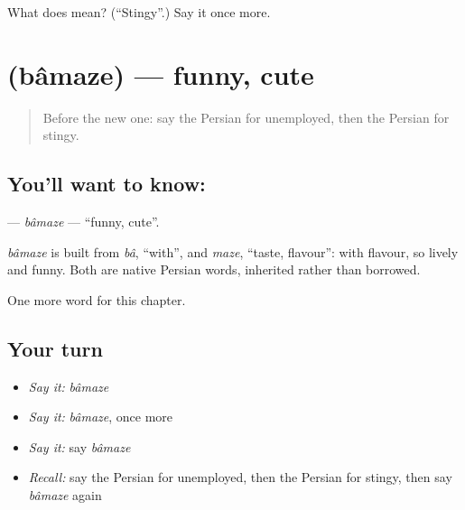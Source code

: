 \begin{tcolorbox}[breakable,colback=teal!4,colframe=teal!35!black,title={Before you move on}]
What does  mean? (\textquotedblleft{}Stingy\textquotedblright{}.) Say it once more.
\end{tcolorbox}
\section[\texorpdfstring{\fa{بامزه} (bâmaze)}{بامزه (bâmaze)}]{ (bâmaze) — funny, cute}

\label{lesson:FA-C236-bamaze}



\begin{quote}
Before the new one: say the Persian for unemployed, then the Persian for stingy.
\end{quote}

\subsection*{You'll want to know: }
\textbf{} — \emph{bâmaze} — \textquotedblleft{}funny, cute\textquotedblright{}.

\begin{cousinweb}
\emph{bâmaze} is built from \emph{bâ}, \textquotedblleft{}with\textquotedblright{}, and \emph{maze}, \textquotedblleft{}taste, flavour\textquotedblright{}: with flavour, so lively and funny. Both are native Persian words, inherited rather than borrowed.
\end{cousinweb}

\begin{grammarlens}[title={What you've built}]
One more word for this chapter.
\end{grammarlens}

\subsection*{Your turn}
\begin{itemize}
\raggedright
  \item \emph{Say it:} \emph{bâmaze}
  \item \emph{Say it:} \emph{bâmaze}, once more
  \item \emph{Say it:} say \emph{bâmaze}
  \item \emph{Recall:} say the Persian for unemployed, then the Persian for stingy, then say \emph{bâmaze} again
\end{itemize}

